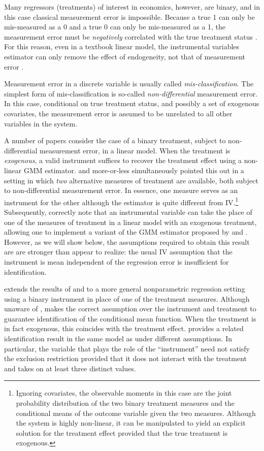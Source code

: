 Many regressors (treatments) of interest in economics, however, are binary, and in this case classical measurement error is impossible.
Because a true 1 can only be mis-measured as a 0 and a true 0 can only be mis-measured as a 1, the measurement error must be \emph{negatively} correlated with the true treatment status \citep{Aigner,Bollinger}. 
For this reason, even in a textbook linear model, the instrumental variables estimator can only remove the effect of endogeneity, not that of measurement error \cite{FL}. 

Measurement error in a discrete variable is usually called \emph{mis-classification}.
The simplest form of mis-classification is so-called \emph{non-differential} measurement error.
In this case, conditional on true treatment status, and possibly a set of exogenous covariates, the measurement error is assumed to be unrelated to all other variables in the system.

A number of papers consider the case of a binary treatment, subject to non-differential measurement error, in a linear model.
When the treatment is \emph{exogenous}, a valid instrument suffices to recover the treatment effect using a non-linear GMM estimator.
\cite{BBS} and \cite{KRS} more-or-less simultaneously pointed this out in a setting in which \emph{two} alternative measures of treatment are available, both subject to non-differential measurement error.
In essence, one measure serves as an instrument for the other although the estimator is quite different from IV.\footnote{Ignoring covariates, the observable moments in this case are the joint probability distribution of the two binary treatment measures and the conditional means of the outcome variable given the two measures. Although the system is highly non-linear, it can be manipulated to yield an explicit solution for the treatment effect provided that the true treatment is exogenous.}
Subsequently, \cite{FL} correctly note that an instrumental variable can take the place of one of the measures of treatment in a linear model with an exogenous treatment, allowing one to implement a variant of the GMM estimator proposed by \cite{BBS} and \cite{KRS}.
However, as we will show below, the assumptions required to obtain this result are are stronger than \cite{FL} appear to realize: the usual IV assumption that the instrument is mean independent of the regression error is insufficient for identification. 



\cite{Mahajan} extends the results of \cite{BBS} and \cite{KRS} to a more general nonparametric regression setting using a binary instrument in place of one of the treatment measures. 
Although unaware of \cite{FL}, \cite{Mahajan} makes the correct assumption over the instrument and treatment to guarantee identification of the conditional mean function.
When the treatment is in fact exogenous, this coincides with the treatment effect.
\cite{Lewbel} provides a related identification result in the same model as \cite{Mahajan} under different assumptions.
In particular, the variable that plays the role of the ``instrument'' need not satisfy the exclusion restriction provided that it does not interact with the treatment and takes on at least three distinct values. 


